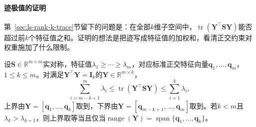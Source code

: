 \paragraph{迹极值的证明}

第~\ref{sec:ls-rank-k-trace}节留下的问题是：在全部$k$维子空间中，$\operatorname{tr}(\bm Y^\top\bm S\bm Y)$能否超过前$k$个特征值之和。证明的想法是把迹写成特征值的加权和，看清正交约束对权重施加了什么限制。

\begin{theorem}[迹极值]
\label{thm:matrix-analysis-trace-minimum}
设$\bm S\in\mathbb R^{m\times m}$实对称，特征值$\lambda_1\geq\cdots\geq\lambda_m$，对应标准正交特征向量$\bm q_1,\ldots,\bm q_m$，$1\leq k\leq m$。对满足$\bm Y^\top\bm Y=\bm I_k$的$\bm Y\in\mathbb R^{m\times k}$，
\begin{equation}
 \sum_{i=m-k+1}^{m}\lambda_i\leq\operatorname{tr}(\bm Y^\top\bm S\bm Y)\leq\sum_{i=1}^{k}\lambda_i,
 \label{eq:matrix-analysis-trace-minimum}
\end{equation}
上界由$\bm Y=[\bm q_1,\ldots,\bm q_k]$取到，下界由$\bm Y=[\bm q_{m-k+1},\ldots,\bm q_m]$取到。若$k<m$且$\lambda_k>\lambda_{k+1}$，则上界取等当且仅当$\operatorname{range}(\bm Y)=\operatorname{span}\{\bm q_1,\ldots,\bm q_k\}$。
\end{theorem}
